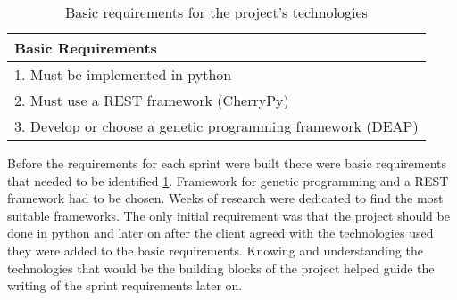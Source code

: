 \begin{table}[ht] 
\caption{Basic requirements for the project's technologies} %
\centering %
\begin{tabular}{l} %
\hline\hline %
Basic Requirements \\ [0.5ex] %
\hline %
1. Must be implemented in python \\
2. Must use a REST framework (CherryPy) \\
3. Develop or choose a genetic programming framework (DEAP) \\
\hline %
\end{tabular} 
\label{table:breq} %
\end{table}

Before the requirements for each sprint were built there were basic requirements that needed to be identified \ref{table:breq}. 
Framework for genetic programming and a REST framework had to be chosen. Weeks of research were dedicated to find the most suitable frameworks.
The only initial requirement was that the project should be done in python and later on after the client agreed with the technologies used they
were  added to the basic requirements. Knowing and understanding the technologies that would be the building blocks of the project helped guide 
the writing of the sprint requirements later on.

